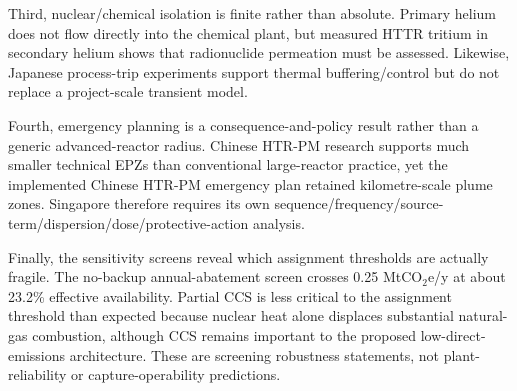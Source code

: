 Third, nuclear/chemical isolation is finite rather than absolute.  Primary helium does not flow directly into the chemical plant, but measured HTTR tritium in secondary helium shows that radionuclide permeation must be assessed.  Likewise, Japanese process-trip experiments support thermal buffering/control but do not replace a project-scale transient model.

Fourth, emergency planning is a consequence-and-policy result rather than a generic advanced-reactor radius.  Chinese HTR-PM research supports much smaller technical EPZs than conventional large-reactor practice, yet the implemented Chinese HTR-PM emergency plan retained kilometre-scale plume zones.  Singapore therefore requires its own sequence/frequency/source-term/dispersion/dose/protective-action analysis.

Finally, the sensitivity screens reveal which assignment thresholds are actually fragile.  The no-backup annual-abatement screen crosses 0.25 MtCO$_2$e/y at about 23.2\% effective availability.  Partial CCS is less critical to the assignment threshold than expected because nuclear heat alone displaces substantial natural-gas combustion, although CCS remains important to the proposed low-direct-emissions architecture.  These are screening robustness statements, not plant-reliability or capture-operability predictions.
